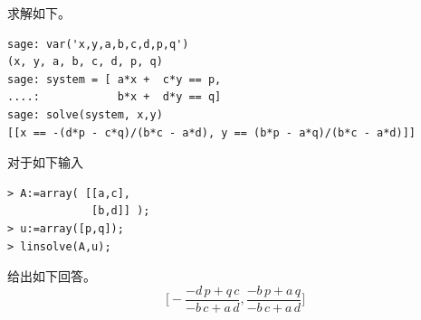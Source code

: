 \begin{exercises}
    \begin{answer}
      \Sage{} 求解如下。
\begin{lstlisting}
sage: var('x,y,a,b,c,d,p,q')
(x, y, a, b, c, d, p, q)
sage: system = [ a*x +  c*y == p,
....:            b*x +  d*y == q]
sage: solve(system, x,y)
[[x == -(d*p - c*q)/(b*c - a*d), y == (b*p - a*q)/(b*c - a*d)]]        
\end{lstlisting}
       对于如下输入
\begin{lstlisting}
> A:=array( [[a,c],
             [b,d]] );
> u:=array([p,q]);
> linsolve(A,u);
\end{lstlisting}
      \Maple{} 给出如下回答。
      \begin{equation*}
        \bigl[-\frac{-d\,p+q\,c}{-b\,c+a\,d},
          \frac{-b\,p+a\,q}{-b\,c+a\,d}\bigr]
      \end{equation*}
    \end{answer}
\end{exercises}
\endinput


